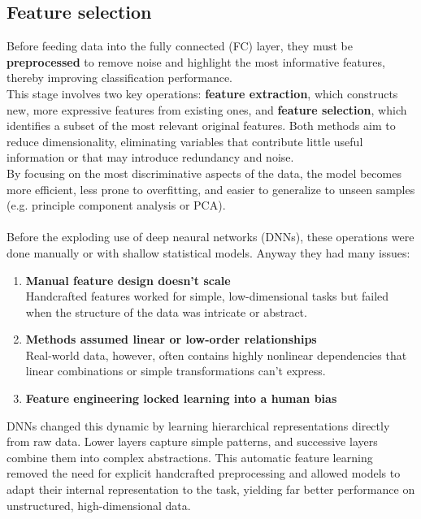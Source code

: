 \subsection{Feature selection}
Before feeding data into the fully connected (FC) layer, they must be \textbf{preprocessed} to remove noise and highlight the most informative features, thereby improving classification performance. \\ This stage involves two key operations: \textbf{feature extraction}, which constructs new, more expressive features from existing ones, and \textbf{feature selection}, which identifies a subset of the most relevant original features. Both methods aim to reduce dimensionality, eliminating variables that contribute little useful information or that may introduce redundancy and noise. \\By focusing on the most discriminative aspects of the data, the model becomes more efficient, less prone to overfitting, and easier to generalize to unseen samples (e.g. principle component analysis or PCA).
\\\\
Before the exploding use of deep neaural networks (DNNs), these operations were done manually or with shallow statistical models. Anyway they had many issues:
\begin{enumerate}
    \item \textbf{Manual feature design doesn’t scale}\\
    Handcrafted features worked for simple, low-dimensional tasks but failed when the structure of the data was intricate or abstract.
    \item \textbf{Methods assumed linear or low-order relationships}\\
    Real-world data, however, often contains highly nonlinear dependencies that linear combinations or simple transformations can’t express.
    \item \textbf{Feature engineering locked learning into a human bias}
\end{enumerate}

DNNs changed this dynamic by learning hierarchical representations directly from raw data. Lower layers capture simple patterns, and successive layers combine them into complex abstractions. This automatic feature learning removed the need for explicit handcrafted preprocessing and allowed models to adapt their internal representation to the task, yielding far better performance on unstructured, high-dimensional data.

